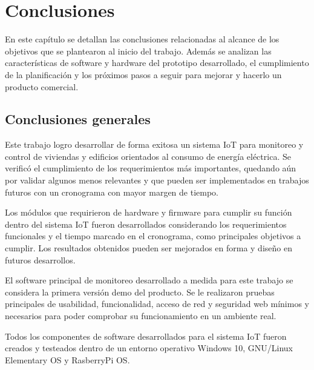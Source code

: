 
\chapter{Conclusiones} %

\label{Chapter5} %

En este capítulo se detallan las conclusiones relacionadas al alcance de los objetivos que se plantearon al inicio del trabajo. Además se analizan las características de software y hardware del prototipo desarrollado, el cumplimiento de la planificación y los próximos pasos a seguir para mejorar y hacerlo un producto
comercial.



\section{Conclusiones generales }

Este trabajo logro desarrollar de forma exitosa un sistema IoT para monitoreo y control de viviendas y edificios orientados al consumo de energía eléctrica. Se verificó el cumplimiento de los requerimientos más importantes, quedando aún por validar algunos menos relevantes y que pueden ser implementados en trabajos futuros con un cronograma con mayor margen de tiempo.

Los módulos que requirieron de hardware y firmware para cumplir su función dentro del sistema IoT fueron desarrollados considerando los requerimientos funcionales y el tiempo marcado en el cronograma, como principales objetivos a cumplir. Los resultados obtenidos pueden ser mejorados en forma y diseño en futuros desarrollos.

El software principal de monitoreo desarrollado a medida para este trabajo se considera la primera versión demo del producto. Se le realizaron pruebas principales de usabilidad, funcionalidad, acceso de red y seguridad web mínimos y necesarios para poder comprobar su funcionamiento en un ambiente real. 

Todos los componentes de software desarrollados para el sistema IoT fueron creados y testeados dentro de un entorno operativo Windows 10, GNU/Linux Elementary OS y RasberryPi OS. 

